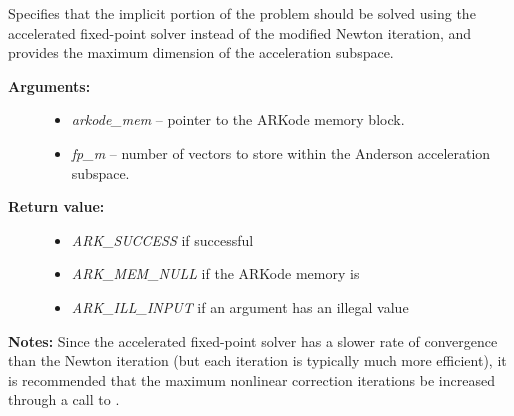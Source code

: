 \documentclass[letterpaper,10pt,english]{sphinxmanual}
\begin{document}

\begin{fulllineitems}
\label{c_interface/User_callable:ARKodeSetFixedPoint}
Specifies that the implicit portion of the problem should be solved
using the accelerated fixed-point solver instead of the modified
Newton iteration, and provides the maximum dimension of the
acceleration subspace.
\begin{description}
\item[{\textbf{Arguments:}}] \leavevmode\begin{itemize}
\item {} 
\emph{arkode\_mem} -- pointer to the ARKode memory block.

\item {} 
\emph{fp\_m} -- number of vectors to store within the Anderson
acceleration subspace.

\end{itemize}

\item[{\textbf{Return value:}}] \leavevmode\begin{itemize}
\item {} 
\emph{ARK\_SUCCESS} if successful

\item {} 
\emph{ARK\_MEM\_NULL} if the ARKode memory is 

\item {} 
\emph{ARK\_ILL\_INPUT} if an argument has an illegal value

\end{itemize}

\end{description}

\textbf{Notes:} Since the accelerated fixed-point solver has a slower
rate of convergence than the Newton iteration (but each iteration
is typically much more efficient), it is recommended that the
maximum nonlinear correction iterations be increased through a call
to {\hyperref[c_interface/User_callable:ARKodeSetMaxNonlinIters]{}}.

\end{fulllineitems}

\end{document}
